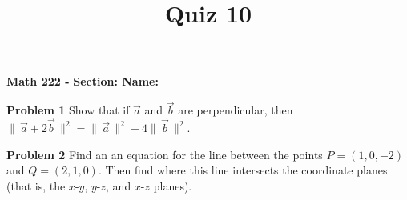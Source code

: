 \documentclass{article}
\title{Quiz 10}
\begin{document}
\begin{center}\makeatletter %
{ \bf Math 222 - \@title }
{ \bf \hfill Section: \underline{\hspace{2cm}} \hfill Name: \underline{\hspace{5cm}} }
\end{center}

{\bf Problem 1} Show that if $\vec{a}$ and $\vec{b}$ are perpendicular, then
$\|\, \vec{a} + 2\vec{b} \,\|^2 = \|\, \vec{a} \,\|^2 + 4\|\, \vec{b}\,\|^2$.
\vfill

{\bf Problem 2} Find an an equation for the line between the points
$P = (1, 0, -2)$ and $Q = (2, 1, 0)$.  Then find where this line intersects
the coordinate planes (that is, the $x$-$y$, $y$-$z$, and $x$-$z$ planes).
\vfill
\end{document}
